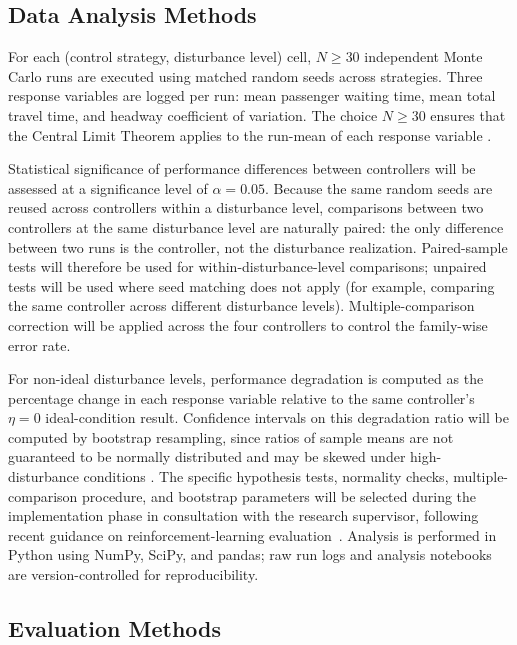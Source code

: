 \subsection{Data Analysis Methods}

For each (control strategy, disturbance level) cell, $N \geq 30$ independent Monte Carlo runs are executed using matched random seeds across strategies. Three response variables are logged per run: mean passenger waiting time, mean total travel time, and headway coefficient of variation. The choice $N \geq 30$ ensures that the Central Limit Theorem applies to the run-mean of each response variable \cite{Wasserman2004}.

Statistical significance of performance differences between controllers will be assessed at a significance level of $\alpha = 0.05$. Because the same random seeds are reused across controllers within a disturbance level, comparisons between two controllers at the same disturbance level are naturally paired: the only difference between two runs is the controller, not the disturbance realization. Paired-sample tests will therefore be used for within-disturbance-level comparisons; unpaired tests will be used where seed matching does not apply (for example, comparing the same controller across different disturbance levels). Multiple-comparison correction will be applied across the four controllers to control the family-wise error rate.

For non-ideal disturbance levels, performance degradation is computed as the percentage change in each response variable relative to the same controller's $\eta = 0$ ideal-condition result. Confidence intervals on this degradation ratio will be computed by bootstrap resampling, since ratios of sample means are not guaranteed to be normally distributed and may be skewed under high-disturbance conditions \cite{EfronTibshirani1993}. The specific hypothesis tests, normality checks, multiple-comparison procedure, and bootstrap parameters will be selected during the implementation phase in consultation with the research supervisor, following recent guidance on reinforcement-learning evaluation~\cite{Henderson2018Matters,Agarwal2021Precipice}. Analysis is performed in Python using NumPy, SciPy, and pandas; raw run logs and analysis notebooks are version-controlled for reproducibility.

\subsection{Evaluation Methods}
\label{subsec:evaluation}

